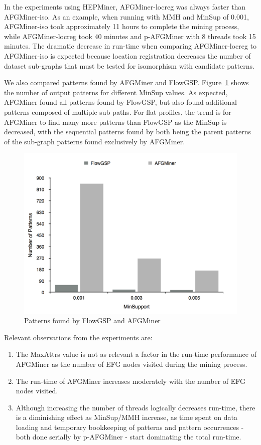 In the experiments using HEPMiner, AFGMiner-locreg was always faster than AFGMiner-iso. As an example, when running with MMH and MinSup of 0.001, AFGMiner-iso took approximately 11 hours to complete the mining process, while AFGMiner-locreg took 40 minutes and p-AFGMiner with 8 threads took 15 minutes. The dramatic decrease in run-time when comparing AFGMiner-locreg to AFGMiner-iso is expected because location registration decreases the number of dataset sub-graphs that must be tested for isomorphism with candidate patterns. 

We also compared patterns found by AFGMiner and FlowGSP. Figure~\ref{fig:NumPatterns} shows the number of output patterns for different MinSup values. As expected, AFGMiner found all patterns found by FlowGSP, but also found additional patterns composed of multiple sub-paths. For flat profiles, the trend is for AFGMiner to find many more patterns than FlowGSP as the MinSup is decreased, with the sequential patterns found by both being the parent patterns of the sub-graph patterns found exclusively by AFGMiner. 

\begin{figure}[h!]
\centering
    \includegraphics[scale=0.18]{figures/numPatternsComp.pdf}
    \caption{Patterns found by FlowGSP and AFGMiner}
    \label{fig:NumPatterns}
\end{figure}

Relevant observations from the experiments are:

\begin{enumerate}
\item The MaxAttrs value is not as relevant a factor in the run-time performance of AFGMiner as the number of EFG nodes visited during the mining process.
\item The run-time of AFGMiner increases moderately with the number of EFG nodes visited.
\item Although increasing the number of threads logically decreases run-time, there is a diminishing effect as MinSup/MMH increase, as time spent on data loading and temporary bookkeeping of patterns and pattern occurrences - both done serially by p-AFGMiner - start dominating the total run-time.
\end{enumerate}

